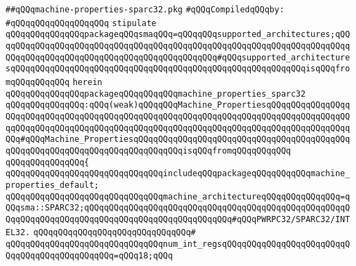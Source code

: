\label{src/lib/compiler/back/low/main/sparc32/machine-properties-sparc32.pkg}
\verb|##qQQqmachine-properties-sparc32.pkg|\newline
\newline
\verb|#qQQqCompiledqQQqby:|\newline
\verb|#qQQqqQQqqQQqqQQqqQQq|\newline
\newline
\verb|stipulate|\newline
\verb|qQQqqQQqqQQqqQQqpackageqQQqsmaqQQq=qQQqqQQqsupported_architectures;qQQqqQQqqQQqqQQqqQQqqQQqqQQqqQQqqQQqqQQqqQQqqQQqqQQqqQQqqQQqqQQqqQQqqQQqqQQqqQQqqQQqqQQqqQQqqQQqqQQqqQQqqQQqqQQqqQQq#qQQqsupported_architecturesqQQqqQQqqQQqqQQqqQQqqQQqqQQqqQQqqQQqqQQqqQQqqQQqqQQqqQQqqQQqisqQQqfromqQQqqQQqqQQq|\newline
\verb|herein|\newline
\newline
\verb|qQQqqQQqqQQqqQQqpackageqQQqqQQqqQQqmachine_properties_sparc32|\newline
\verb|qQQqqQQqqQQqqQQq:qQQq(weak)qQQqqQQqMachine_PropertiesqQQqqQQqqQQqqQQqqQQqqQQqqQQqqQQqqQQqqQQqqQQqqQQqqQQqqQQqqQQqqQQqqQQqqQQqqQQqqQQqqQQqqQQqqQQqqQQqqQQqqQQqqQQqqQQqqQQqqQQqqQQqqQQqqQQqqQQqqQQqqQQqqQQqqQQqqQQqqQQq#qQQqMachine_PropertiesqQQqqQQqqQQqqQQqqQQqqQQqqQQqqQQqqQQqqQQqqQQqqQQqqQQqqQQqqQQqqQQqqQQqqQQqqQQqqQQqisqQQqfromqQQqqQQqqQQq|\newline
\verb|qQQqqQQqqQQqqQQq{|\newline
\verb|qQQqqQQqqQQqqQQqqQQqqQQqqQQqqQQqincludeqQQqpackageqQQqqQQqqQQqmachine_properties_default;|\newline
\newline
\verb|qQQqqQQqqQQqqQQqqQQqqQQqqQQqqQQqmachine_architectureqQQqqQQqqQQqqQQq=qQQqsma::SPARC32;qQQqqQQqqQQqqQQqqQQqqQQqqQQqqQQqqQQqqQQqqQQqqQQqqQQqqQQqqQQqqQQqqQQqqQQqqQQqqQQqqQQqqQQqqQQqqQQqqQQq#qQQqPWRPC32/SPARC32/INTEL32.|\newline
\verb|qQQqqQQqqQQqqQQqqQQqqQQqqQQqqQQq#|\newline
\verb|qQQqqQQqqQQqqQQqqQQqqQQqqQQqqQQqnum_int_regsqQQqqQQqqQQqqQQqqQQqqQQqqQQqqQQqqQQqqQQqqQQqqQQq=qQQq18;qQQq|\newline
